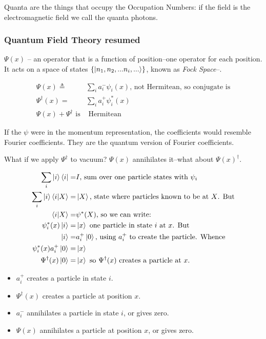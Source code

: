 \documentclass[]{article}
\begin{document}
Quanta are the things that occupy the Occupation Numbers: if the field is the electromagnetic field we call the quanta photons.

\subsubsection{Quantum Field Theory resumed}
$\Psi(x)$ -- an operator that is a function of position--one operator for each position. It acts on a space of states $\{\ket{n_1,n_2,...n_i,...}\}$, known as \emph{Fock Space}--\cite{wiki:fock}.

\begin{align*}
	\Psi(x)\triangleq&\sum_{i}a^-_i\psi_i(x)\text{, not Hermitean, so conjugate is}\\
	\Psi^\dagger(x)=&\sum_{i}a^+_i\psi_i^*(x)\\
	\Psi(x)+\Psi^\dagger \text{ is}&\text{ Hermitean}
\end{align*}

If the $\psi$ were in the momentum representation, the coefficients would resemble Fourier coefficients. They are the quantum version of Fourier coefficients. 

What if we apply $\Psi^\dagger$ to vacuum? $\Psi(x)$ annihilates it--what about $\Psi(x)^\dagger$.

\begin{align*}
	\sum_{i} \ket{i} \bra{i} =& I \text{, sum over one particle states with $\psi_i$}\\
\sum_{i} \ket{i} \braket{i|X} =& \ket{X} \text{, state where particles known to be at $X$. But}\\
	\braket{i|X}=&\psi^*(X) \text{, so we can write:}\\
	\psi^*_i(x)\ket{i} =& \ket{x}\text{ one particle in state $i$ at $x$. But}\\
	\ket{i} =& a^+_i\ket{0} \text{, using $a^+_i$ to create the particle. Whence}\\
	\psi^*_i(x) a^+_i\ket{0}=&\ket{x}\\
	\Psi^\dagger(x) \ket{0} =& \ket{x}\text{ so $\Psi^\dagger(x)$ creates a particle at $x$.}
\end{align*}

\begin{itemize}
	\item $a^+_i$ creates a particle in state $i$.
	\item $\Psi^\dagger(x)$  creates a particle at position $x$.
	\item $a^-_i$ annihilates a particle in state $i$, or gives zero.
	\item $\Psi(x)$  annihilates a particle at position $x$, or gives zero.
\end{itemize}
\end{document}
